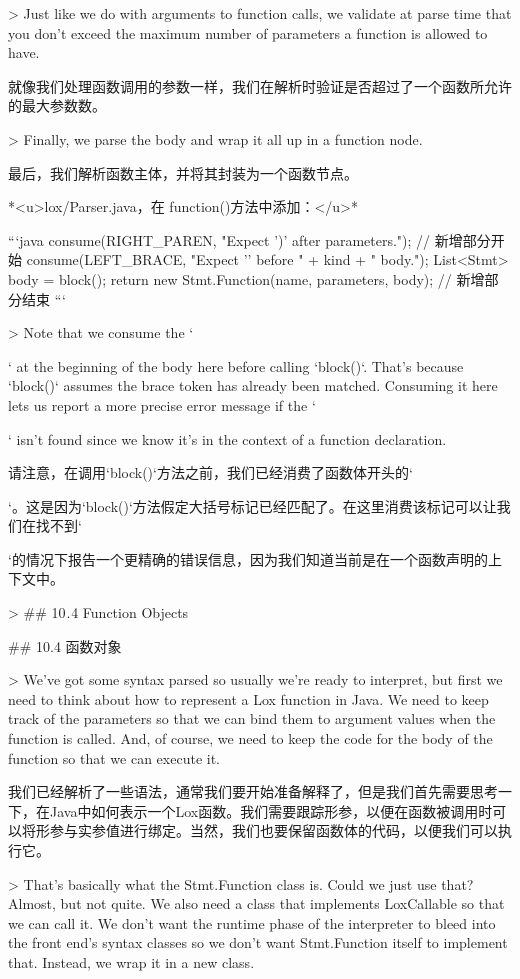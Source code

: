 \documentclass[cn,11pt,chinese]{elegantbook}
\begin{document}
{{{{> Just like we do with arguments to function calls, we validate at parse time that you don’t exceed the maximum number of parameters a function is allowed to have.

就像我们处理函数调用的参数一样，我们在解析时验证是否超过了一个函数所允许的最大参数数。

> Finally, we parse the body and wrap it all up in a function node.

最后，我们解析函数主体，并将其封装为一个函数节点。

*<u>lox/Parser.java，在 function()方法中添加：</u>*

```java
    consume(RIGHT_PAREN, "Expect ')' after parameters.");
    // 新增部分开始
    consume(LEFT_BRACE, "Expect '{' before " + kind + " body.");
    List<Stmt> body = block();
    return new Stmt.Function(name, parameters, body);
    // 新增部分结束
  }
```

> Note that we consume the `{` at the beginning of the body here before calling `block()`. That’s because `block()` assumes the brace token has already been matched. Consuming it here lets us report a more precise error message if the `{` isn’t found since we know it’s in the context of a function declaration.

请注意，在调用`block()`方法之前，我们已经消费了函数体开头的`{`。这是因为`block()`方法假定大括号标记已经匹配了。在这里消费该标记可以让我们在找不到`{`的情况下报告一个更精确的错误信息，因为我们知道当前是在一个函数声明的上下文中。

> ## 10 . 4 Function Objects

## 10.4 函数对象

> We’ve got some syntax parsed so usually we’re ready to interpret, but first we need to think about how to represent a Lox function in Java. We need to keep track of the parameters so that we can bind them to argument values when the function is called. And, of course, we need to keep the code for the body of the function so that we can execute it.

我们已经解析了一些语法，通常我们要开始准备解释了，但是我们首先需要思考一下，在Java中如何表示一个Lox函数。我们需要跟踪形参，以便在函数被调用时可以将形参与实参值进行绑定。当然，我们也要保留函数体的代码，以便我们可以执行它。

> That’s basically what the Stmt.Function class is. Could we just use that? Almost, but not quite. We also need a class that implements LoxCallable so that we can call it. We don’t want the runtime phase of the interpreter to bleed into the front end’s syntax classes so we don’t want Stmt.Function itself to implement that. Instead, we wrap it in a new class.

}}}}}}}}
\end{document}
